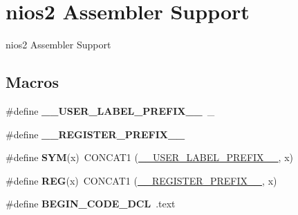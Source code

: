 \hypertarget{group__RTEMSScoreCPUnios2ASM}{}\section{nios2 Assembler Support}
\label{group__RTEMSScoreCPUnios2ASM}


nios2 Assembler Support  


\subsection*{Macros}
\begin{DoxyCompactItemize}
\item 
\mbox{\label{group__RTEMSScoreCPUnios2ASM_gaff6bf0ff0fa3b5cbd23a8ae1131c87a9}} 
\#define {\bfseries \+\_\+\+\_\+\+U\+S\+E\+R\+\_\+\+L\+A\+B\+E\+L\+\_\+\+P\+R\+E\+F\+I\+X\+\_\+\+\_\+}~\+\_\+
\item 
\mbox{\label{group__RTEMSScoreCPUnios2ASM_ga08d4062230ffc8494f4be4f6447497e4}} 
\#define {\bfseries \+\_\+\+\_\+\+R\+E\+G\+I\+S\+T\+E\+R\+\_\+\+P\+R\+E\+F\+I\+X\+\_\+\+\_\+}
\item 
\mbox{\label{group__RTEMSScoreCPUnios2ASM_gafe05d428a5f345f51fb591debb815325}} 
\#define {\bfseries S\+YM}(x)~C\+O\+N\+C\+A\+T1 (\mbox{\hyperlink{group__RTEMSScoreCPUx86-64ASM_gaff6bf0ff0fa3b5cbd23a8ae1131c87a9}{\+\_\+\+\_\+\+U\+S\+E\+R\+\_\+\+L\+A\+B\+E\+L\+\_\+\+P\+R\+E\+F\+I\+X\+\_\+\+\_\+}}, x)
\item 
\mbox{\label{group__RTEMSScoreCPUnios2ASM_gacee196421e9a06f7700bb3064b13b37a}} 
\#define {\bfseries R\+EG}(x)~C\+O\+N\+C\+A\+T1 (\mbox{\hyperlink{group__RTEMSScoreCPUV850ASM_ga08d4062230ffc8494f4be4f6447497e4}{\+\_\+\+\_\+\+R\+E\+G\+I\+S\+T\+E\+R\+\_\+\+P\+R\+E\+F\+I\+X\+\_\+\+\_\+}}, x)
\item 
\mbox{\label{group__RTEMSScoreCPUnios2ASM_ga63dd305e6cb437ad2dc29a4184f96fbc}} 
\#define {\bfseries B\+E\+G\+I\+N\+\_\+\+C\+O\+D\+E\+\_\+\+D\+CL}~.text
\item 
\mbox{\label{group__RTEMSScoreCPUnios2ASM_gad7bee6a7cae4ed99b9f83f54afaecec8}} 

\end{DoxyCompactItemize}
